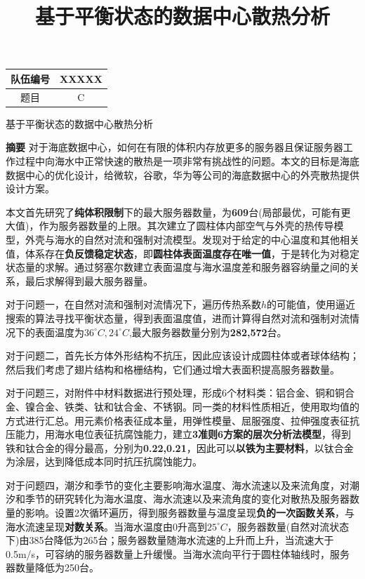 \documentclass{article}
\title{\LARGE 基于平衡状态的数据中心散热分析}
\begin{document}
	\begin{table}[H]
		\centering
		\begin{tabular}{cc}
			\toprule[1.5pt]
			队伍编号  & XXXXX \\
			\midrule
			题目    & C \\
			\bottomrule[1.5pt]
		\end{tabular}%
	\end{table}%
	\begin{center}
	\LARGE 基于平衡状态的数据中心散热分析
    \end{center}
	\large

	\textbf{摘要}  \quad 	对于海底数据中心，如何在有限的体积内存放更多的服务器且保证服务器工作过程中向海水中正常快速的散热是一项非常有挑战性的问题。本文的目标是海底数据中心的优化设计，给微软，谷歌，华为等公司的海底数据中心的外壳散热提供设计方案。
	
	本文首先研究了\textbf{纯体积限制}下的最大服务器数量，为\textbf{609}台(局部最优，可能有更大值)，作为服务器数量的上限。其次建立了圆柱体内部空气与外壳的热传导模型，外壳与海水的自然对流和强制对流模型。发现对于给定的中心温度和其他相关值，体系存在\textbf{负反馈稳定状态}，即\textbf{圆柱体表面温度存在唯一值}，于是转化为对稳定状态量的求解。通过努塞尔数建立表面温度与海水温度差和服务器容纳量之间的关系，最后求解得到最大服务器量。
	
	对于问题一，在自然对流和强制对流情况下，遍历传热系数$h$的可能值，使用逼近搜索的算法寻找平衡状态量，得到表面温度值，进而计算得自然对流和强制对流情况下的表面温度为$36 ^\circ C ,24 ^\circ C$,最大服务器数量分别为\textbf{282,572}台。
	
	对于问题二，首先长方体外形结构不抗压，因此应该设计成圆柱体或者球体结构；然后我们考虑了翅片结构和格栅结构，它们通过增大表面积提高服务器数量。
	
	对于问题三，对附件中材料数据进行预处理，形成6个材料类：铝合金、铜和铜合金、镍合金、铁类、钛和钛合金、不锈钢。同一类的材料性质相近，使用取均值的方式进行汇总。用元素价格表征成本量，用弹性模量、屈服强度、拉伸强度表征抗压能力，用海水电位表征抗腐蚀能力，建立\textbf{3准则6方案的层次分析法模型}，得到铁和钛合金的得分最高，分别为\textbf{0.22,0.21}，因此可以\textbf{以铁为主要材料}，以钛合金为涂层，达到降低成本同时抗压抗腐蚀能力。
	
	对于问题四，潮汐和季节的变化主要影响海水温度、海水流速以及来流角度，对潮汐和季节的研究转化为海水温度、海水流速以及来流角度的变化对散热及服务器数量的影响。设置2次循环遍历，得到服务器数量与温度呈现\textbf{负的一次函数关系}，与海水流速呈现\textbf{对数关系}。当海水温度由$0$升高到$25^\circ C$，服务器数量(自然对流状态下)由385台降低为265台；服务器数量随海水流速的上升而上升，当流速大于0.5m/s，可容纳的服务器数量上升缓慢。当海水流向平行于圆柱体轴线时，服务器数量降低为250台。
	
\end{document}
